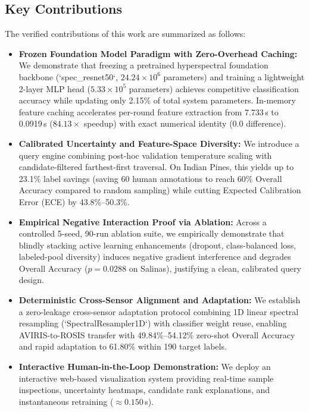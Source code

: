 \documentclass[conference,letterpaper]{IEEEtran}
\begin{document}
\subsection{Key Contributions}
The verified contributions of this work are summarized as follows:
\begin{itemize}
    \item \textbf{Frozen Foundation Model Paradigm with Zero-Overhead Caching:} We demonstrate that freezing a pretrained hyperspectral foundation backbone (`spec\_resnet50`, $24.24\times 10^6$ parameters) and training a lightweight 2-layer MLP head ($5.33\times 10^5$ parameters) achieves competitive classification accuracy while updating only 2.15\% of total system parameters. In-memory feature caching accelerates per-round feature extraction from 7.733\,s to 0.0919\,s ($84.13\times$ speedup) with exact numerical identity ($0.0$ difference).
    \item \textbf{Calibrated Uncertainty and Feature-Space Diversity:} We introduce a query engine combining post-hoc validation temperature scaling with candidate-filtered farthest-first traversal. On Indian Pines, this yields up to 23.1\% label savings (saving 60 human annotations to reach 60\% Overall Accuracy compared to random sampling) while cutting Expected Calibration Error (ECE) by 43.8\%--50.3\%.
    \item \textbf{Empirical Negative Interaction Proof via Ablation:} Across a controlled 5-seed, 90-run ablation suite, we empirically demonstrate that blindly stacking active learning enhancements (dropout, class-balanced loss, labeled-pool diversity) induces negative gradient interference and degrades Overall Accuracy ($p=0.0288$ on Salinas), justifying a clean, calibrated query design.
    \item \textbf{Deterministic Cross-Sensor Alignment and Adaptation:} We establish a zero-leakage cross-sensor adaptation protocol combining 1D linear spectral resampling (`SpectralResampler1D`) with classifier weight reuse, enabling AVIRIS-to-ROSIS transfer with 49.84\%--54.12\% zero-shot Overall Accuracy and rapid adaptation to 61.80\% within 190 target labels.
    \item \textbf{Interactive Human-in-the-Loop Demonstration:} We deploy an interactive web-based visualization system providing real-time sample inspections, uncertainty heatmaps, candidate rank explanations, and instantaneous retraining ($\approx 0.150$\,s).
\end{itemize}

\end{document}
